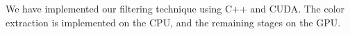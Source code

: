 \begin{columns}
{\begin{minipage}[t]{1.0\linewidth}
\begin{multicols*}{2}
		We have implemented our filtering technique using C++ and CUDA. The color extraction is implemented on the CPU, and the remaining stages on the GPU.

	\end{multicols*}
	\end{minipage}%
      
	}
	
	

\end{columns}
